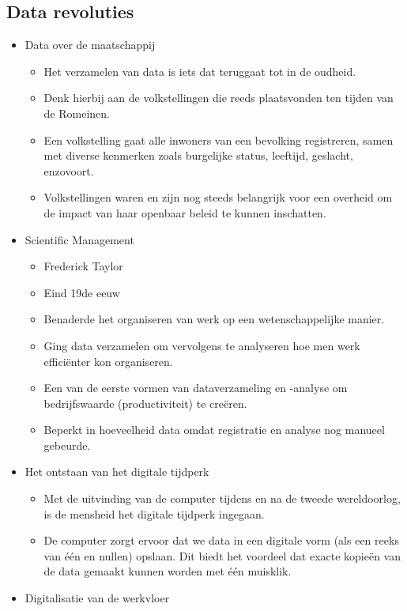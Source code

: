 \documentclass[]{tufte-book}
\providecommand{\tightlist}{%
  \setlength{\itemsep}{0pt}\setlength{\parskip}{0pt}}
\begin{document}
\hypertarget{data-revoluties}{%
\subsection{Data revoluties}\label{data-revoluties}}

\begin{itemize}
\tightlist
\item
  Data over de maatschappij

  \begin{itemize}
  \tightlist
  \item
    Het verzamelen van data is iets dat teruggaat tot in de oudheid.
  \item
    Denk hierbij aan de volkstellingen die reeds plaatsvonden ten tijden van de Romeinen.
  \item
    Een volkstelling gaat alle inwoners van een bevolking registreren, samen met diverse kenmerken zoals burgelijke status, leeftijd, geslacht, enzovoort.
  \item
    Volkstellingen waren en zijn nog steeds belangrijk voor een overheid om de impact van haar openbaar beleid te kunnen inschatten.
  \end{itemize}
\item
  Scientific Management

  \begin{itemize}
  \tightlist
  \item
    Frederick Taylor
  \item
    Eind 19de eeuw
  \item
    Benaderde het organiseren van werk op een wetenschappelijke manier.
  \item
    Ging data verzamelen om vervolgens te analyseren hoe men werk efficiënter kon organiseren.
  \item
    Een van de eerste vormen van dataverzameling en -analyse om bedrijfswaarde (productiviteit) te creëren.
  \item
    Beperkt in hoeveelheid data omdat registratie en analyse nog manueel gebeurde.
  \end{itemize}
\item
  Het ontstaan van het digitale tijdperk

  \begin{itemize}
  \tightlist
  \item
    Met de uitvinding van de computer tijdens en na de tweede wereldoorlog, is de mensheid het digitale tijdperk ingegaan.
  \item
    De computer zorgt ervoor dat we data in een digitale vorm (als een reeks van één en nullen) opslaan. Dit biedt het voordeel dat exacte kopieën van de data gemaakt kunnen worden met één muisklik.
  \end{itemize}
\item
  Digitalisatie van de werkvloer


\end{itemize}
\end{document}
